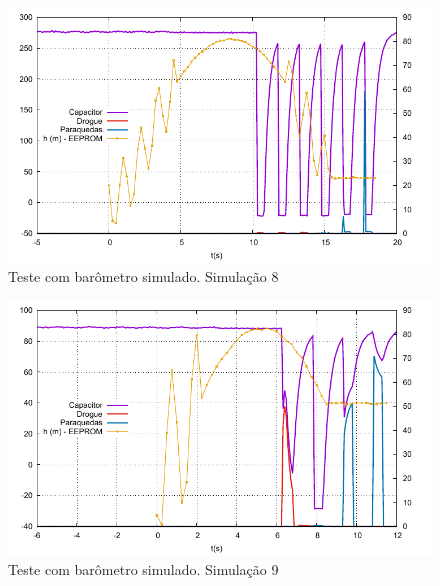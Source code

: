 \documentclass[12pt,a4paper]{article}
\begin{document}
\begin{figure}[!ht]
	\centering
	\includegraphics[width=\textwidth]{./data/simulations-v1.5.5/sim08/fig}
	\caption{Teste com barômetro simulado.  Simulação 8}
	\label{fig:sim08}
\end{figure}
\begin{figure}[!ht]
	\centering
	\includegraphics[width=\textwidth]{./data/simulations-v1.5.5/sim09/fig}
	\caption{Teste com barômetro simulado.  Simulação 9}
	\label{fig:sim09}
\end{figure}
\end{document}
